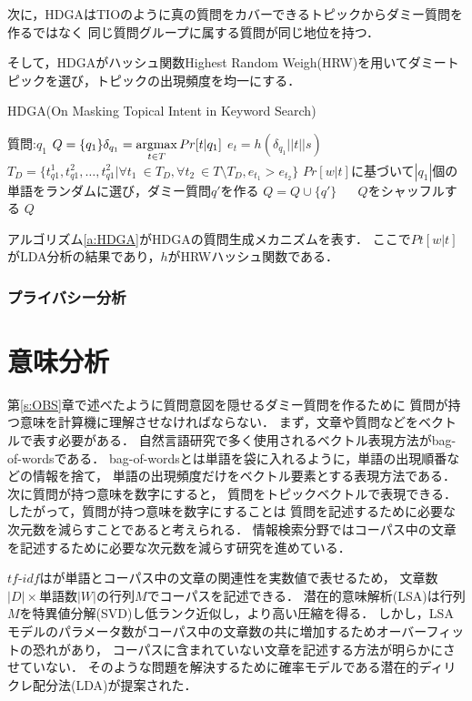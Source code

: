 \documentclass[master]{suribt}
\theoremstyle{definition}
\newcommand{\argmax}{\mathop{\rm argmax}\limits}
\begin{document}
 次に，HDGAはTIOのように真の質問をカバーできるトピックからダミー質問を作るではなく
 同じ質問グループに属する質問が同じ地位を持つ．

 そして，HDGAがハッシュ関数Highest Random Weigh(HRW)\cite{}を用いてダミートピックを選び，トピックの出現頻度を均一にする．

 \begin{algorithm}
 \caption{HDGA(On Masking Topical Intent in Keyword Search)}
 \begin{algorithmic}[1]
  \Require 質問:$q_1$
  \State $Q = \{q_1\}\delta_{q_1} = \argmax_{t \in T} Pr[t|q_1]$
  \State $e_t = h(\delta_{q_1}||t||s)$
  \EndFor
  \State $T_D = \{t^1_{q1},t^2_{q1}, \dots , t^2_{q1} | \forall t_1 \ \in T_D , \forall t_2 \ \in T \setminus T_D, e_{t_1} > e_{t_2} \}$
  \While { $ \argmax_{t \in T} Pr[t|q'] \neq t$}
  \State $Pr[w|t]$に基づいて$|q_1|$個の単語をランダムに選び，ダミー質問$q'$を作る
  \EndWhile
  \State $Q = Q \cup \{q'\}$
  \EndFor　
  \State $Q$をシャッフルする
  \Ensure $Q$
 \end{algorithmic}
 \label{a:HDGA}
 \end{algorithm}

 アルゴリズム\ref{a:HDGA}がHDGAの質問生成メカニズムを表す．
 ここで$Pt[w|t]$がLDA分析の結果であり，$h$がHRWハッシュ関数である．

 \subsection{プライバシー分析}

 \chapter{意味分析} \label{s:sm}
 第\ref{s:OBS}章で述べたように質問意図を隠せるダミー質問を作るために
 質問が持つ意味を計算機に理解させなければならない．
 まず，文章や質問などをベクトルで表す必要がある．
 自然言語研究で多く使用されるベクトル表現方法がbag-of-wordsである．
 bag-of-wordsとは単語を袋に入れるように，単語の出現順番などの情報を捨て，
 単語の出現頻度だけをベクトル要素とする表現方法である．
 次に質問が持つ意味を数字にすると，
 質問をトピックベクトルで表現できる．
 したがって，質問が持つ意味を数字にすることは
 質問を記述するために必要な次元数を減らすことであると考えられる．
 情報検索分野ではコーパス中の文章を記述するために必要な次元数を減らす研究を進めている．

 $tf\text{-}idf$はが単語とコーパス中の文章の関連性を実数値で表せるため，
 文章数$|D| \times$単語数$|W|$の行列$M$でコーパスを記述できる．
 潜在的意味解析(LSA)は行列$M$を特異値分解(SVD)し低ランク近似し，より高い圧縮を得る．
 しかし，LSAモデルのパラメータ数がコーパス中の文章数の共に増加するためオーバーフィットの恐れがあり，
 コーパスに含まれていない文章を記述する方法が明らかにさせていない．
 そのような問題を解決するために確率モデルである潜在的ディリクレ配分法(LDA)が提案された．
\end{document}
